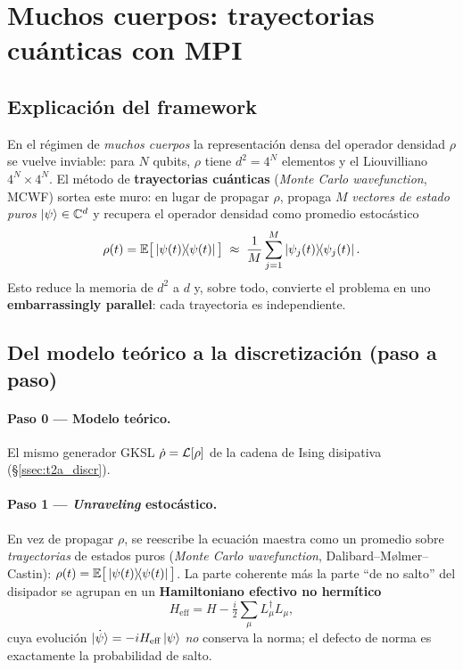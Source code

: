 \section{Muchos cuerpos: trayectorias cuánticas con MPI}
\label{sec:t3}

\subsection{Explicación del framework}
En el régimen de \emph{muchos cuerpos} la representación densa del operador
densidad $\rho$ se vuelve inviable: para $N$ qubits, $\rho$ tiene $d^2=4^N$
elementos y el Liouvilliano $4^N\times4^N$. El método de \textbf{trayectorias
cuánticas} (\emph{Monte Carlo wavefunction}, MCWF) sortea este muro: en lugar de
propagar $\rho$, propaga $M$ \emph{vectores de estado puros}
$\ket{\psi}\in\mathbb{C}^{d}$ y recupera el operador densidad como promedio
estocástico
\[
\rho(t)=\mathbb{E}\big[\dyad{\psi(t)}{\psi(t)}\big]\;\approx\;\frac1M\sum_{j=1}^{M}\dyad{\psi_j(t)}{\psi_j(t)}.
\]
Esto reduce la memoria de $d^2$ a $d$ y, sobre todo, convierte el problema en uno
\textbf{embarrassingly parallel}: cada trayectoria es independiente.

\subsection{Del modelo teórico a la discretización (paso a paso)}
\label{ssec:t3_discr}

\paragraph{Paso 0 — Modelo teórico.} El mismo generador GKSL
$\dot\rho=\mathcal{L}[\rho]$ de la cadena de Ising disipativa (\S\ref{ssec:t2a_discr}).

\paragraph{Paso 1 — \emph{Unraveling} estocástico.} En vez de propagar $\rho$, se
reescribe la ecuación maestra como un promedio sobre \emph{trayectorias} de
estados puros (\emph{Monte Carlo wavefunction}, Dalibard--Mølmer--Castin):
$\rho(t)=\mathbb{E}\big[\dyad{\psi(t)}{\psi(t)}\big]$. La parte coherente más la
parte ``de no salto'' del disipador se agrupan en un \textbf{Hamiltoniano efectivo
no hermítico}
\[
H_{\mathrm{eff}}=H-\tfrac{i}{2}\sum_\mu L_\mu^\dagger L_\mu,
\]
cuya evolución $\dot{\ket\psi}=-iH_{\mathrm{eff}}\ket\psi$ \emph{no} conserva la
norma; el defecto de norma es exactamente la probabilidad de salto.

